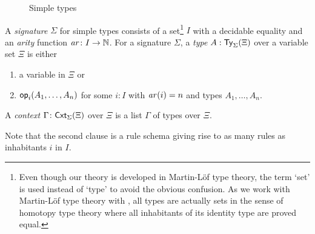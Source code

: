 \begin{definition} \label{def:simple-signature}
  \begin{figure}
      \centering
      \small
      \caption{Simple types}
      \label{fig:simple-type}
  \end{figure}
  A \emph{signature} $\Sigma$ for simple types consists of a set\footnote{%
    Even though our theory is developed in Martin-L\"of type theory, the term `set' is used instead of `type' to avoid the obvious confusion. 
    As we work with Martin-L\"of type theory with \AxiomK, all types are actually sets in the sense of homotopy type theory where all inhabitants of its identity type are proved equal.
  }
  $I$ with a decidable equality and an \emph{arity} function $\mathit{ar}\colon I \to \mathbb{N}$.
  For a signature $\Sigma$, a \emph{type} $A : \mathsf{Ty}_{\Sigma}(\Xi)$ over a variable set $\Xi$ is either
  \begin{enumerate}
    \item a variable in $\Xi$ or
    \item $\mathsf{op}_{i}(A_1, \ldots, A_n)$ for some $i:I$ with $\mathit{ar}(i) = n$ and types $A_1,\ldots, A_n$.
  \end{enumerate}
  A \emph{context} $\Gamma \colon \mathsf{Cxt}_{\Sigma}(\Xi)$ over $\Xi$ is a list $\Gamma$ of types over $\Xi$. 
\end{definition}
Note that the second clause is a rule schema giving rise to as many rules as inhabitants $i$ in $I$.

